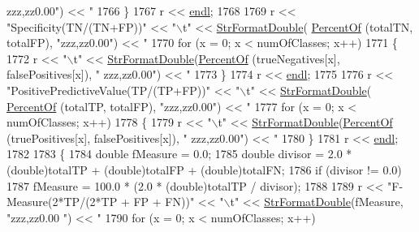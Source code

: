 \begin{DoxyCode}
{{      zzz,zz0.00"}) << \textcolor{stringliteral}{"%
1766   \}
1767   r << \hyperlink{namespace_k_k_b_ad1f50f65af6adc8fa9e6f62d007818a8}{endl};
1768 
1769   r << \textcolor{stringliteral}{"Specificity(TN/(TN+FP))"} << \textcolor{stringliteral}{"\(\backslash\)t"} << \hyperlink{namespace_k_k_b_a1a40a40e955fa5417a7cdd990e0021b1}{StrFormatDouble}(
      \hyperlink{_confusion_matrix2_8cpp_ac6428bbca684e442948860947ad8ca02}{PercentOf} (totalTN, totalFP), \textcolor{stringliteral}{"zzz,zz0.00"}) << \textcolor{stringliteral}{"%
1770   \textcolor{keywordflow}{for}  (x = 0;  x < numOfClasses;  x++)
1771   \{
1772     r << \textcolor{stringliteral}{"\(\backslash\)t"} << \hyperlink{namespace_k_k_b_a1a40a40e955fa5417a7cdd990e0021b1}{StrFormatDouble}(\hyperlink{_confusion_matrix2_8cpp_ac6428bbca684e442948860947ad8ca02}{PercentOf} (trueNegatives[x], falsePositives[x]), \textcolor{stringliteral}{"
      zzz,zz0.00"}) << \textcolor{stringliteral}{"%
1773   \}
1774   r << \hyperlink{namespace_k_k_b_ad1f50f65af6adc8fa9e6f62d007818a8}{endl};
1775 
1776   r << \textcolor{stringliteral}{"PositivePredictiveValue(TP/(TP+FP))"} << \textcolor{stringliteral}{"\(\backslash\)t"} << \hyperlink{namespace_k_k_b_a1a40a40e955fa5417a7cdd990e0021b1}{StrFormatDouble}(
      \hyperlink{_confusion_matrix2_8cpp_ac6428bbca684e442948860947ad8ca02}{PercentOf} (totalTP, totalFP), \textcolor{stringliteral}{"zzz,zz0.00"}) << \textcolor{stringliteral}{"%
1777   \textcolor{keywordflow}{for}  (x = 0;  x < numOfClasses;  x++)
1778   \{
1779     r << \textcolor{stringliteral}{"\(\backslash\)t"} << \hyperlink{namespace_k_k_b_a1a40a40e955fa5417a7cdd990e0021b1}{StrFormatDouble}(\hyperlink{_confusion_matrix2_8cpp_ac6428bbca684e442948860947ad8ca02}{PercentOf} (truePositives[x], falsePositives[x]), \textcolor{stringliteral}{"
      zzz,zz0.00"}) << \textcolor{stringliteral}{"%
1780   \}
1781   r << \hyperlink{namespace_k_k_b_ad1f50f65af6adc8fa9e6f62d007818a8}{endl};
1782 
1783   \{
1784     \textcolor{keywordtype}{double}  fMeasure = 0.0;
1785     \textcolor{keywordtype}{double}  divisor = 2.0 * (double)totalTP + (\textcolor{keywordtype}{double})totalFP + (double)totalFN;
1786     \textcolor{keywordflow}{if}  (divisor != 0.0)
1787       fMeasure = 100.0 * (2.0 * (double)totalTP / divisor);
1788 
1789     r << \textcolor{stringliteral}{"F-Measure(2*TP/(2*TP + FP + FN))"} << \textcolor{stringliteral}{"\(\backslash\)t"} << \hyperlink{namespace_k_k_b_a1a40a40e955fa5417a7cdd990e0021b1}{StrFormatDouble}(fMeasure, \textcolor{stringliteral}{"zzz,zz0.00
      "}) << \textcolor{stringliteral}{"%
1790     \textcolor{keywordflow}{for}  (x = 0;  x < numOfClasses;  x++)
}}}}}}}
\end{DoxyCode}
